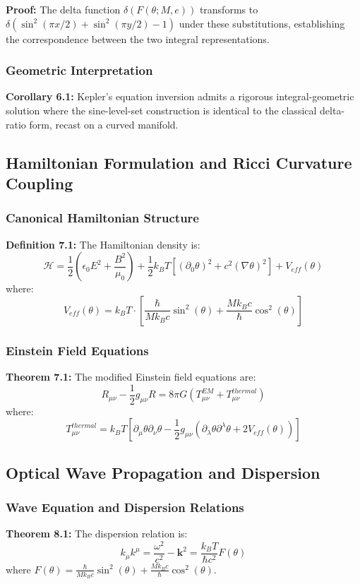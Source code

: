 ﻿\documentclass[12pt]{article}
\begin{document}
\textbf{Proof:} The delta function $\delta(F(\theta; M, e))$ transforms to $\delta(\sin^2(\pi x/2) + \sin^2(\pi y/2) - 1)$ under these substitutions, establishing the correspondence between the two integral representations.

\subsubsection{Geometric Interpretation}
\textbf{Corollary 6.1:} Kepler's equation inversion admits a rigorous integral-geometric solution where the sine-level-set construction is identical to the classical delta-ratio form, recast on a curved manifold.

\subsection{Hamiltonian Formulation and Ricci Curvature Coupling}

\subsubsection{Canonical Hamiltonian Structure}
\textbf{Definition 7.1:} The Hamiltonian density is:
$$\mathcal{H} = \frac{1}{2}\left(\epsilon_0 E^2 + \frac{B^2}{\mu_0}\right) + \frac{1}{2}k_B T[(\partial_0\theta)^2 + c^2(\nabla\theta)^2] + V_{eff}(\theta)$$
where:
$$V_{eff}(\theta) = k_B T \cdot \left[\frac{\hbar}{Mk_Bc}\sin^2(\theta) + \frac{Mk_Bc}{\hbar}\cos^2(\theta)\right]$$

\subsubsection{Einstein Field Equations}
\textbf{Theorem 7.1:} The modified Einstein field equations are:
$$R_{\mu\nu} - \frac{1}{2}g_{\mu\nu}R = 8\pi G(T_{\mu\nu}^{EM} + T_{\mu\nu}^{thermal})$$
where:
$$T_{\mu\nu}^{thermal} = k_B T[\partial_\mu\theta\partial_\nu\theta - \frac{1}{2}g_{\mu\nu}(\partial_\lambda\theta\partial^\lambda\theta + 2V_{eff}(\theta))]$$

\subsection{Optical Wave Propagation and Dispersion}

\subsubsection{Wave Equation and Dispersion Relations}
\textbf{Theorem 8.1:} The dispersion relation is:
$$k_\mu k^\mu = \frac{\omega^2}{c^2} - \mathbf{k}^2 = \frac{k_B T}{\hbar c^2}F(\theta)$$
where $F(\theta) = \frac{\hbar}{Mk_Bc}\sin^2(\theta) + \frac{Mk_Bc}{\hbar}\cos^2(\theta)$.
\end{document}
